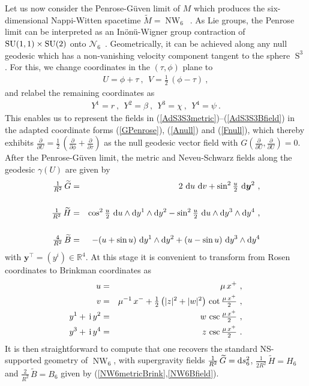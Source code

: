 \documentclass[11pt,a4paper]{article}
\DeclareMathOperator{\Sphere}{S}
\DeclareMathOperator{\NW}{NW}
\let\S\Sphere
\newcommand{\ii}{{\rm i}}
\newcommand{\mbf}[1]{{\boldsymbol {#1} }}
\def\ii{{\,{\rm i}\,}}
\def\dd{{\rm d}}
\newcommand{\real}{{\mathbb R}} %
\def\nn{\nonumber}
\def\bea{\begin{eqnarray}}
\def\eea{\end{eqnarray}}
\newcommand{\beq}{\begin{eqnarray}}
\newcommand{\eeq}{\end{eqnarray}}
\begin{document}
Let us now consider the Penrose-G\"uven limit of $M$ which produces the
six-dimensional Nappi-Witten spacetime
$\widetilde{M}=\NW_6$~\cite{BFP1}. As Lie groups, the Penrose limit
can be interpreted as an In\"on\"u-Wigner group contraction of ${\rm
  SU}(1,1)\times{\rm SU}(2)$ onto
$\mathcal{N}_6$~\cite{SF1}. Geometrically, it can be achieved along
any null geodesic which has a non-vanishing velocity component tangent
to the sphere $\S^3$. For this, we change coordinates in the
$(\tau,\phi)$ plane to
\beq
U=\phi+\tau \ , ~~ V=\mbox{$\frac12$}\,(\phi-\tau) \ ,
\label{UVAdS3S3def}\eeq
and relabel the remaining coordinates as
\beq
Y^1=r \ , ~~ Y^2=\beta \ , ~~ Y^3=\chi \ , ~~ Y^4=\psi \ .
\label{Yrelabel}\eeq
This enables us to represent the fields in
(\ref{AdS3S3metric})--(\ref{AdS3S3Bfield}) in the adapted coordinate
forms (\ref{GPenrose}), (\ref{Anull}) and (\ref{Fnull}),  which
thereby exhibits $\frac\partial{\partial
  U}=\frac12\,(\frac\partial{\partial\phi}+\frac\partial{\partial\tau})$
as the null geodesic vector field with $G(\frac\partial{\partial
  U},\frac\partial{\partial U})=0$. After the Penrose-G\"uven limit,
the metric and Neveu-Schwarz fields along the geodesic $\gamma(U)$ are
given by
\bea
\mbox{$\frac1{R^2}$}\,\widetilde{G}&=&2~\dd u~\dd v+\sin^2\mbox{$
\frac u2$}~\dd{\mbf y}^2 \ , \label{NW6tildemetric}\\&&{~~~~}^{~~}_{~~}\nn\\
\mbox{$\frac1{R^2}$}\,\widetilde{H}&=&\cos^2\mbox{$\frac u2$}~\dd u
\wedge\dd y^1\wedge\dd y^2-\sin^2\mbox{$\frac u2$}~\dd u\wedge\dd y^3
\wedge\dd y^4 \ , \label{NW6tildeflux}\\&&{~~~~}^{~~}_{~~}\nn\\
\mbox{$\frac4{R^2}$}\,
\widetilde{B}&=&-(u+\sin u)~\dd y^1\wedge\dd y^2+(u-\sin u)~
\dd y^3\wedge\dd y^4
\label{NW6tildeBfield}\eea
with ${\mbf y}^\top=(y^i)\in\real^4$. At this stage it is convenient
to transform from Rosen coordinates to Brinkman coordinates as
\bea
u&=&\mu\,x^+ \ , \nn\\v&=&\mu^{-1}\,x^-+\mbox{$\frac12$}\,
\bigl(|z|^2+|w|^2\bigr)\,
\cot\mbox{$\frac{\mu\,x^+}2$} \ , \nn\\y^1+\ii y^2&=&w\,
\csc\mbox{$\frac{\mu\,x^+}2$} \ ,
\nn\\y^3+\ii y^4&=&z\,\csc\mbox{$\frac{\mu\,x^+}2$} \ .
\label{BrinkfromAdS3S3}\eea
It is then straightforward to compute that one recovers the standard
NS-supported geometry of $\NW_6$, with supergravity fields
$\frac1{R^2}\,\widetilde{G}=\dd s_6^2$,
$\frac1{2R^2}\,\widetilde{H}=H_6$ and $\frac2{R^2}\,\widetilde{B}=B_6$
given by (\ref{NW6metricBrink},\ref{NW6Bfield}).
\end{document}
